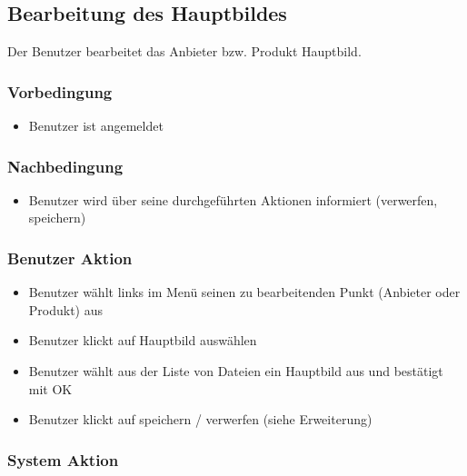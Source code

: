 \documentclass[a4paper,12pt]{article}
\begin{document}
\clearpage

\subsection{Bearbeitung des Hauptbildes}
Der Benutzer bearbeitet das Anbieter bzw. Produkt Hauptbild.

\subsubsection{Vorbedingung}\label{vorbedingung-4}

\begin{itemize}

\item
  Benutzer ist angemeldet
\end{itemize}

\subsubsection{Nachbedingung}\label{nachbedingung-4}

\begin{itemize}

\item
  Benutzer wird über seine durchgeführten Aktionen informiert
  (verwerfen, speichern)
\end{itemize}

\subsubsection{Benutzer Aktion}\label{benutzer-aktion-4}

\begin{itemize}

\item
  Benutzer wählt links im Menü seinen zu bearbeitenden Punkt (Anbieter
  oder Produkt) aus
\item
  Benutzer klickt auf Hauptbild auswählen
\item
  Benutzer wählt aus der Liste von Dateien ein Hauptbild aus und
  bestätigt mit OK
\item
  Benutzer klickt auf speichern / verwerfen (siehe Erweiterung)
\end{itemize}

\subsubsection{System Aktion}\label{system-aktion-4}
\end{document}
